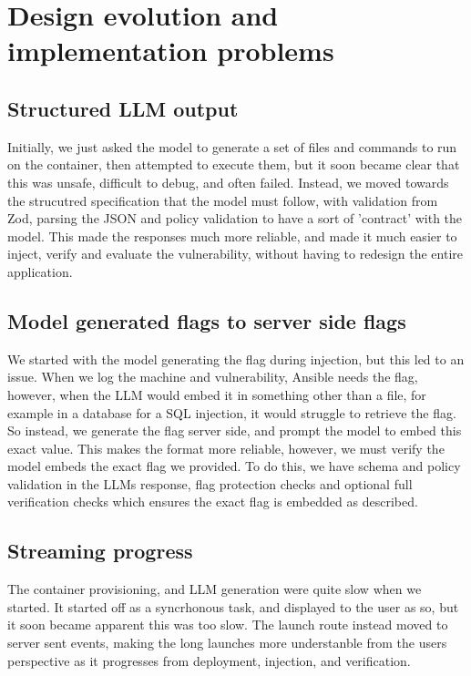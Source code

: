 \section{Design evolution and implementation problems}\label{sec:implementation-problems}

\subsection{Structured LLM output}\label{sec:llm-output}

Initially, we just asked the model to generate a set of files and commands to run on the container, then attempted to execute them, but it soon became clear that this was unsafe, difficult to debug, and often failed. Instead, we moved towards the strucutred specification that the model must follow, with validation from Zod, parsing the JSON and policy validation to have a sort of 'contract' with the model. This made the responses much more reliable, and made it much easier to inject, verify and evaluate the vulnerability, without having to redesign the entire application.

\subsection{Model generated flags to server side flags}\label{sec:flag-generation}

We started with the model generating the flag during injection, but this led to an issue. When we log the machine and vulnerability, Ansible needs the flag, however, when the LLM would embed it in something other than a file, for example in a database for a SQL injection, it would struggle to retrieve the flag. So instead, we generate the flag server side, and prompt the model to embed this exact value. This makes the format more reliable, however, we must verify the model embeds the exact flag we provided. To do this, we have schema and policy validation in the LLMs response, flag protection checks and optional full verification checks which ensures the exact flag is embedded as described.

\subsection{Streaming progress}\label{sec:streaming-progress}

The container provisioning, and LLM generation were quite slow when we started. It started off as a syncrhonous task, and displayed to the user as so, but it soon became apparent this was too slow. The launch route instead moved to server sent events, making the long launches more understanble from the users perspective as it progresses from deployment, injection, and verification.

